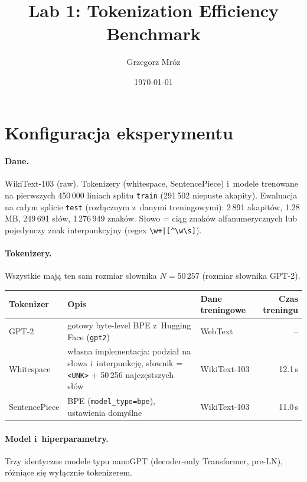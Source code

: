 \documentclass[11pt,a4paper]{article}
\title{Lab 1: Tokenization Efficiency Benchmark}
\author{Grzegorz Mróz}
\date{\today}
\begin{document}
\maketitle

\section{Konfiguracja eksperymentu}

\paragraph{Dane.} WikiText-103 (raw). Tokenizery (whitespace, SentencePiece) i~modele trenowane na pierwszych 450\,000 liniach splitu \texttt{train} (291\,502 niepuste akapity). Ewaluacja na całym splicie \texttt{test} (rozłącznym z~danymi treningowymi): 2\,891 akapitów, 1.28\,MB, 249\,691 słów, 1\,276\,949 znaków. Słowo = ciąg znaków alfanumerycznych lub pojedynczy znak interpunkcyjny (regex \verb!\w+|[^\w\s]!).

\paragraph{Tokenizery.} Wszystkie mają ten sam rozmiar słownika $N = 50\,257$ (rozmiar słownika GPT-2).

\begin{center}\small
\begin{tabularx}{\textwidth}{@{}lXlr@{}}
\toprule
Tokenizer & Opis & Dane treningowe & Czas treningu \\
\midrule
GPT-2 & gotowy byte-level BPE z~Hugging Face (\texttt{gpt2}) & WebText & -- \\
Whitespace & własna implementacja: podział na słowa i~interpunkcję, słownik = \texttt{<UNK>} + 50\,256 najczęstszych słów & WikiText-103 & 12.1\,s \\
SentencePiece & BPE (\texttt{model\_type=bpe}), ustawienia domyślne & WikiText-103 & 11.0\,s \\
\bottomrule
\end{tabularx}
\end{center}

\paragraph{Model i~hiperparametry.} Trzy identyczne modele typu nanoGPT (decoder-only Transformer, pre-LN), różniące się wyłącznie tokenizerem.
\end{document}
